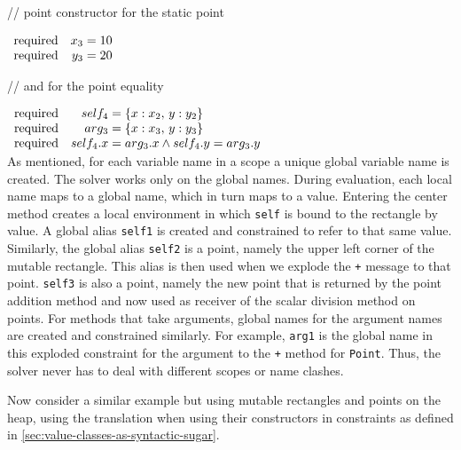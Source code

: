 \begin{flushright}
// point constructor for the static point
\end{flushright}\vspace{-0.5\baselineskip}
$\begin{array}{rr@{\;=\;}l}
\mathrm{required} & x_3 & 10\\
\mathrm{required} & y_3 & 20
\end{array}$\vspace{-0.5\baselineskip}
\begin{flushright}
// and for the point equality
\end{flushright}\vspace{-0.5\baselineskip}
$\begin{array}{rr@{\;=\;}l}
\mathrm{required} & self_4 & \{x: x_2,\,y: y_2\}\\
\mathrm{required} & arg_3 & \{x: x_3,\,y: y_3\}\\
\mathrm{required} & self_4.x & arg_3.x \wedge self_4.y = arg_3.y
\end{array}$\\

As mentioned, for each variable name in a scope a unique global
variable name is created.  The solver works only on the global
names. During evaluation, each local name maps to a global name, which
in turn maps to a value. Entering the center method creates a local
environment in which \verb|self| is bound to the rectangle by value.
A global alias \verb|self1| is created and constrained to refer to
that same value.  Similarly, the global alias \verb|self2| is a point,
namely the upper left corner of the mutable rectangle.  This alias is
then used when we explode the \verb|+| message to that point.
\verb|self3| is also a point, namely the new point that is returned by
the point addition method and now used as receiver of the scalar
division method on points.  For methods that take arguments, global
names for the argument names are created and constrained similarly.
For example, \verb|arg1| is the global name in this exploded
constraint for the argument to the \verb|+| method for
\verb|Point|. Thus, the solver never has to deal with different scopes
or name clashes.

Now consider a similar example but using mutable rectangles and points
on the heap, using the translation when using their constructors in
constraints as defined in
\autoref{sec:value-classes-as-syntactic-sugar}.


